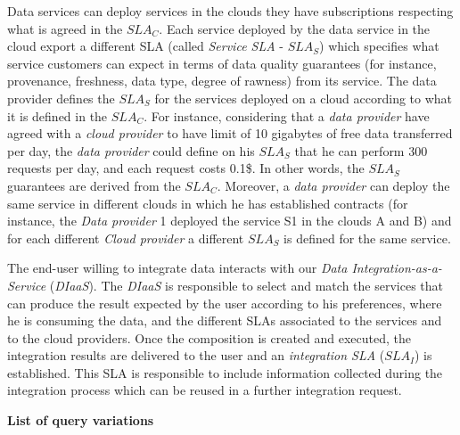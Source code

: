 \documentclass[12pt,a4paper,oneside]{article}
\begin{document}
Data services can deploy services in the clouds they have subscriptions respecting what is agreed in the $SLA_{C}$. Each service deployed by the data service in the cloud export a different SLA (called \textsl{Service SLA} - $SLA_{S}$) which specifies what service customers can expect in terms of data quality guarantees (for instance, provenance, freshness, data type, degree of rawness) from its service. The data provider defines the $SLA_{S}$ for the services deployed on a cloud according to what it is defined in the $SLA_{C}$. For instance, considering that a \textsl{data provider} have agreed with a \textsl{cloud provider} to have limit of 10 gigabytes of free data transferred per day, the \textsl{data provider} could define on his $SLA_{S}$ that he can perform 300 requests per day, and each request costs 0.1\$. In other words, the $SLA_{S}$ guarantees are derived from the $SLA_{C}$. Moreover, a \textsl{data provider} can deploy the same service in different clouds in which he has established contracts (for instance, the \textsl{Data provider} 1 deployed the service S1 in the clouds A and B) and for each different \textsl{Cloud provider} a different $SLA_{S}$ is defined for the same service.

The end-user willing to integrate data interacts with our \textsl{Data Integration-as-a-Service} (\textsl{DIaaS}). The \textsl{DIaaS} is responsible to select and match the services that can produce the result expected by the user according to his preferences, where he is consuming the data, and the different SLAs associated to the services and to the cloud providers. Once the composition is created and executed, the integration results are delivered to the user and an \textsl{integration SLA} ($SLA_{I}$) is established. This SLA is responsible to include information collected during the integration process which can be reused in a further integration request.



\begin{flushleft}
\textbf{List of query variations}
\end{flushleft}
\end{document}
